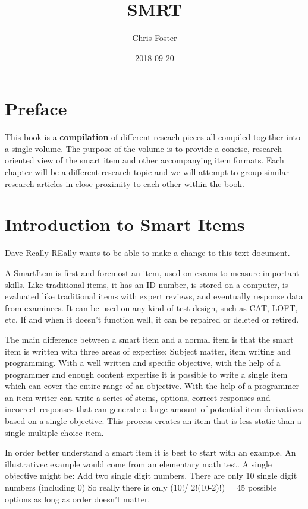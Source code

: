 \documentclass[]{book}
\title{SMRT}
\author{Chris Foster}
\date{2018-09-20}
\theoremstyle{definition}
\theoremstyle{definition}
\theoremstyle{definition}
\theoremstyle{remark}
\begin{document}
\maketitle

{
\setcounter{tocdepth}{1}
\tableofcontents
}
\chapter{Preface}\label{preface}

This book is a \textbf{compilation} of different reseach pieces all
compiled together into a single volume. The purpose of the volume is to
provide a concise, research oriented view of the smart item and other
accompanying item formats. Each chapter will be a different research
topic and we will attempt to group similar research articles in close
proximity to each other within the book.

\chapter{Introduction to Smart Items}\label{introduction-to-smart-items}

Dave Really REally wants to be able to make a change to this text
document.

A SmartItem is first and foremost an item, used on exams to measure
important skills. Like traditional items, it has an ID number, is stored
on a computer, is evaluated like traditional items with expert reviews,
and eventually response data from examinees. It can be used on any kind
of test design, such as CAT, LOFT, etc. If and when it doesn't function
well, it can be repaired or deleted or retired.

The main difference between a smart item and a normal item is that the
smart item is written with three areas of expertise: Subject matter,
item writing and programming. With a well written and specific
objective, with the help of a programmer and enough content expertise it
is possible to write a single item which can cover the entire range of
an objective. With the help of a programmer an item writer can write a
series of stems, options, correct responses and incorrect responses that
can generate a large amount of potential item derivatives based on a
single objective. This process creates an item that is less static than
a single multiple choice item.

In order better understand a smart item it is best to start with an
example. An illustrativec example would come from an elementary math
test. A single objective might be: Add two single digit numbers. There
are only 10 single digit numbers (including 0) So really there is only
(10!/ 2!(10-2)!) = 45 possible options as long as order doesn't matter.
\end{document}
